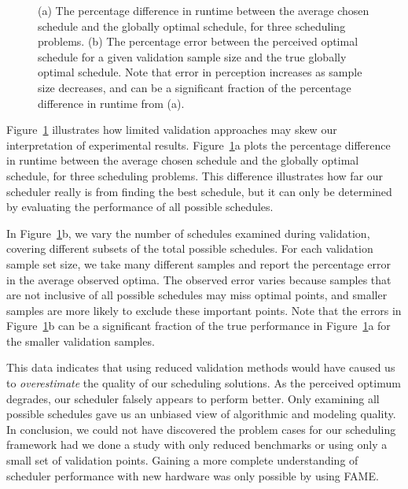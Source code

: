 \begin{figure}[htb]
	\noindent{}
        \caption{\label{fig:case_study_valid}  (a) The percentage
          difference in runtime between the average chosen schedule
          and the globally optimal schedule, for three scheduling
          problems. (b) The percentage error between the perceived
          optimal schedule for a given validation sample size and the
          true globally optimal schedule. Note that error in
          perception increases as sample size decreases, and can be a
          significant fraction of the percentage difference in runtime
          from (a).  }
\end{figure}

Figure~\ref{fig:case_study_valid} illustrates how limited validation
approaches may skew our interpretation of experimental
results. Figure~\ref{fig:case_study_valid}a plots the percentage
difference in runtime between the average chosen schedule and the
globally optimal schedule, for three scheduling problems.  This
difference illustrates how far our scheduler really is from finding
the best schedule, but it can only be determined by evaluating the
performance of all possible schedules.

In Figure~\ref{fig:case_study_valid}b, we vary the number of schedules
examined during validation, covering different subsets of the total
possible schedules. For each validation sample set size, we take many
different samples and report the percentage error in the average
observed optima. The observed error varies because samples that are
not inclusive of all possible schedules may miss optimal points, and
smaller samples are more likely to exclude these important
points. Note that the errors in Figure~\ref{fig:case_study_valid}b can
be a significant fraction of the true performance in
Figure~\ref{fig:case_study_valid}a for the smaller validation samples.

This data indicates that using reduced validation methods would have
caused us to {\em overestimate} the quality of our scheduling
solutions.  As the perceived optimum degrades, our scheduler falsely
appears to perform better. Only examining all possible schedules gave
us an unbiased view of algorithmic and modeling quality.
In conclusion, we could not have discovered the problem cases for our
scheduling framework had we done a study with only reduced benchmarks
or using only a small set of validation points. Gaining a more
complete understanding of scheduler performance with new hardware
was only possible by using FAME.

